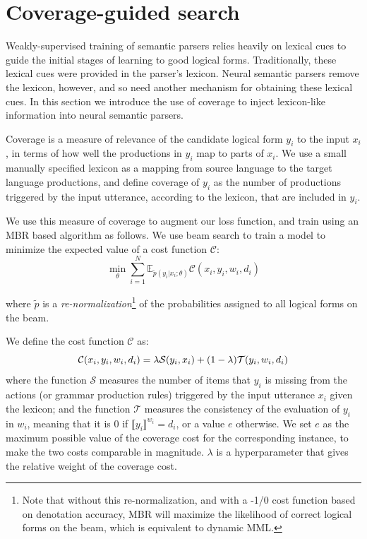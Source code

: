 \section{Coverage-guided search}\label{sec:coverage_guided_search}
Weakly-supervised training of semantic parsers relies heavily on lexical cues
to guide the initial stages of learning to good logical forms.  Traditionally,
these lexical cues were provided in the parser's lexicon.  Neural semantic
parsers remove the lexicon, however, and so need another mechanism for
obtaining these lexical cues.  In this section we introduce the use of coverage
to inject lexicon-like information into neural semantic parsers.

Coverage is a measure of relevance of the candidate logical form $y_i$ to the
input $x_i$, in terms of how well the productions in $y_i$ map to parts of
$x_i$. We use a small manually specified lexicon as a mapping from source
language to the target language productions, and define coverage of $y_i$ as
the number of productions triggered by the input utterance, according to the
lexicon, that are included in $y_i$.

We use this measure of coverage to augment our loss function, and train using
an MBR based algorithm as follows. We use beam search to train a model to
minimize the expected value of a cost function $\mathcal{C}$: \begin{equation}
	\min_{\theta} \sum_{i=1}^{N} \mathbb{E}_{\tilde{p}(y_i|x_i;
	\theta)}\mathcal{C}(x_i, y_i, w_i, d_i) \label{eq:erm} \end{equation}

\noindent where $\tilde{p}$ is a \emph{re-normalization}\footnote{Note that
without this re-normalization, and with a -1/0 cost function based on
denotation accuracy, MBR will maximize the likelihood of correct logical forms
on the beam, which is equivalent to dynamic MML.} of the probabilities assigned
to all logical forms on the beam.

We define the cost function $\mathcal{C}$ as: \begin{equation} \mathcal{C}(x_i,
y_i, w_i, d_i) = \lambda \mathcal{S}(y_i, x_i) + \\ (1 -
\lambda)\mathcal{T}(y_i, w_i, d_i) \label{eq:cost} \end{equation} where the
function $\mathcal{S}$ measures the number of items that $y_i$ is missing from
the actions (or grammar production rules) triggered by the input utterance
$x_i$ given the lexicon; and the function $\mathcal{T}$ measures the
consistency of the evaluation of $y_i$ in $w_i$, meaning that it is $0$ if
$\llbracket y_i\rrbracket^{w_i} = d_i$, or a value $e$ otherwise.  We set $e$
as the maximum possible value of the coverage cost for the corresponding
instance, to make the two costs comparable in magnitude.  $\lambda$ is a
hyperparameter that gives the relative weight of the coverage cost.


